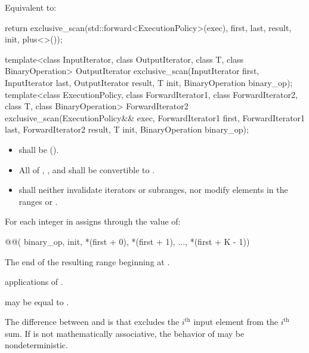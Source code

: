 \begin{itemdescr}
\pnum
\effects Equivalent to:
\begin{codeblock}
return exclusive_scan(std::forward<ExecutionPolicy>(exec),
                      first, last, result, init, plus<>());
\end{codeblock}
\end{itemdescr}


%
\begin{itemdecl}
template<class InputIterator, class OutputIterator, class T, class BinaryOperation>
  OutputIterator exclusive_scan(InputIterator first, InputIterator last,
                                OutputIterator result, T init, BinaryOperation binary_op);
template<class ExecutionPolicy,
         class ForwardIterator1, class ForwardIterator2, class T, class BinaryOperation>
  ForwardIterator2 exclusive_scan(ExecutionPolicy&& exec,
                                  ForwardIterator1 first, ForwardIterator1 last,
                                  ForwardIterator2 result, T init, BinaryOperation binary_op);
\end{itemdecl}

\begin{itemdescr}
\pnum
\requires
\begin{itemize}
\item {} shall be  ().
\item All of , ,
and  shall be convertible to .
\item {} shall neither invalidate iterators or subranges, nor modify
elements in the ranges  or .
\end{itemize}

\pnum
\effects
For each integer  in 
assigns through  the value of:
\begin{codeblock}
@@(
    binary_op, init, *(first + 0), *(first + 1), ..., *(first + K - 1))
\end{codeblock}

\pnum
\returns
The end of the resulting range beginning at .

\pnum
\complexity
{} applications of .

\pnum
\remarks
{} may be equal to .

\pnum
\begin{note}
The difference between  and  is
that  excludes the $i^\text{th}$ input element from the
$i^\text{th}$ sum. If  is not mathematically associative, the
behavior of  may be nondeterministic.
\end{note}
\end{itemdescr}

